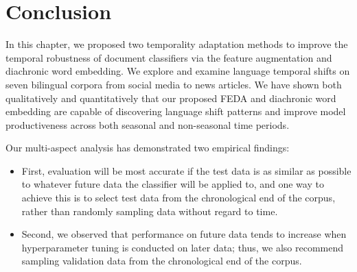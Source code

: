 \section{Conclusion}
\label{chap3:sec:conclusion}

In this chapter, we proposed two temporality adaptation methods to improve the temporal robustness of document classifiers via the feature augmentation and diachronic word embedding.
We explore and examine language temporal shifts on seven bilingual corpora from social media to news articles.
We have shown both qualitatively and quantitatively that our proposed FEDA and diachronic word embedding are capable of discovering language shift patterns and improve model productiveness across both seasonal and non-seasonal time periods.

Our multi-aspect analysis has demonstrated two empirical findings:
\begin{itemize}
    \item First, evaluation will be most accurate if the test data is as similar as possible to whatever future data the classifier will be applied to, and one way to achieve this is to select test data from the chronological end of the corpus, rather than randomly sampling data without regard to time.
    \item Second, we observed that performance on future data tends to increase when hyperparameter tuning is conducted on later data; thus, we also recommend sampling validation data from the chronological end of the corpus.
\end{itemize}
